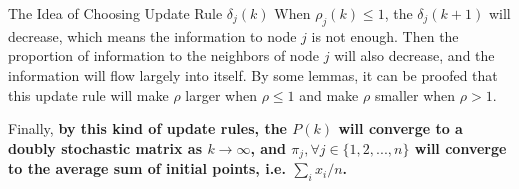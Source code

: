 	\begin{remark}{The Idea of Choosing Update Rule $\delta_j(k)$}{}
		When $\rho_j(k)\le 1$, the $\delta_j(k+1)$ will decrease, which means the information to node $j$ is not enough. Then the proportion of information to the neighbors of node $j$ will also decrease, and the information will flow largely into itself. By some lemmas, it can be proofed that this update rule will make $\rho$ larger when  $\rho\le 1$ and make $\rho$ smaller when  $\rho> 1$.
	\end{remark}
	
	Finally, \textbf{by this kind of update rules, the $P(k)$ will converge to a doubly stochastic matrix as $k\rightarrow \infty$, and $\pi_j,\forall j\in\{1,2,...,n\}$ will converge to the average sum of initial points, i.e. $\sum_i x_i/n$.}
\ifx\allfiles\undefined

\fi